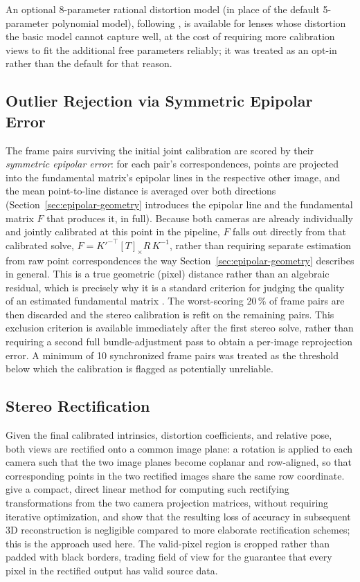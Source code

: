 An optional 8-parameter rational distortion model (in place of the default
5-parameter polynomial model), following \textcite{claus_rational_2005}, is
available for lenses whose distortion the basic model cannot capture well,
at the cost of requiring more calibration views to fit the additional free
parameters reliably; it was treated as an opt-in rather than the default for
that reason.

\subsection{Outlier Rejection via Symmetric Epipolar Error}
\label{sec:outlier-rejection}

The frame pairs surviving the initial joint calibration are scored by their
\emph{symmetric epipolar error}: for each pair's correspondences, points
are projected into the fundamental matrix's epipolar lines in the
respective other image, and the mean point-to-line distance is averaged
over both directions (Section~\ref{sec:epipolar-geometry} introduces the
epipolar line and the fundamental matrix $F$ that produces it, in full).
Because both cameras are already individually and jointly calibrated at
this point in the pipeline, $F$ falls out directly from that calibrated
solve, $F = K'^{-\top}[T]_\times R\,K^{-1}$, rather than requiring separate
estimation from raw point correspondences the way
Section~\ref{sec:epipolar-geometry} describes in general. This is a true
geometric (pixel) distance rather than an
algebraic residual, which is precisely why it is a standard criterion for
judging the quality of an estimated fundamental matrix
\parencite{fathy2011}. The worst-scoring 20\,\% of frame pairs are then
discarded and the stereo calibration is refit on the remaining pairs. This
exclusion criterion is available immediately after the first stereo solve,
rather than requiring a second full bundle-adjustment pass to obtain a
per-image reprojection error. A minimum of 10 synchronized frame
pairs was treated as the threshold below which the calibration is flagged as
potentially unreliable.

\subsection{Stereo Rectification}
\label{sec:stereo-rectification}

Given the final calibrated intrinsics, distortion coefficients, and relative
pose, both views are rectified onto a common image plane: a rotation is
applied to each camera such that the two image planes become coplanar and
row-aligned, so that corresponding points in the two rectified images share
the same row coordinate. \textcite{fusiello2000} give a compact, direct
linear method for computing such rectifying transformations from the two
camera projection matrices, without requiring iterative optimization, and
show that the resulting loss of accuracy in subsequent 3D reconstruction is
negligible compared to more elaborate rectification schemes; this is the
approach used here. The valid-pixel region is cropped rather than padded
with black borders, trading field of view for the guarantee that every
pixel in the rectified output has valid source data.

